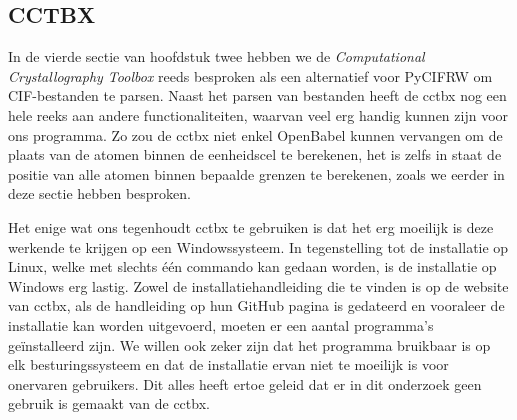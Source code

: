 \subsection{CCTBX}
In de vierde sectie van hoofdstuk twee hebben we de \textit{Computational Crystallography Toolbox} reeds besproken als een alternatief voor PyCIFRW om CIF-bestanden te parsen. Naast het parsen van bestanden heeft de cctbx nog een hele reeks aan andere functionaliteiten, waarvan veel erg handig kunnen zijn voor ons programma. Zo zou de cctbx niet enkel OpenBabel kunnen vervangen om de plaats van de atomen binnen de eenheidscel te berekenen, het is zelfs in staat de positie van alle atomen binnen bepaalde grenzen te berekenen, zoals we eerder in deze sectie hebben besproken.
\par
Het enige wat ons tegenhoudt cctbx te gebruiken is dat het erg moeilijk is deze werkende te krijgen op een Windowssysteem. In tegenstelling tot de installatie op Linux, welke met slechts één commando kan gedaan worden, is de installatie op Windows erg lastig. Zowel de installatiehandleiding die te vinden is op de website van cctbx, als de handleiding op hun GitHub pagina is gedateerd en vooraleer de installatie kan worden uitgevoerd, moeten er een aantal programma's geïnstalleerd zijn. We willen ook zeker zijn dat het programma bruikbaar is op elk besturingssysteem en dat de installatie ervan niet te moeilijk is voor onervaren gebruikers. Dit alles heeft ertoe geleid dat er in dit onderzoek geen gebruik is gemaakt van de cctbx.

